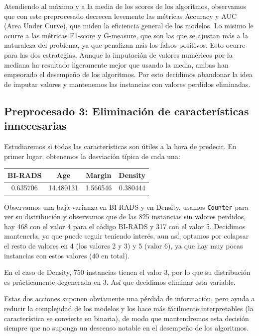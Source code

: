 \documentclass{article}
\begin{document}
Atendiendo al máximo y a la media de los scores de los algoritmos,
observamos que con este preprocesado decrecen levemente las métricas
Accuracy y AUC (Area Under Curve), que miden la eficiencia general de
los modelos. Lo misimo le ocurre a las métricas F1-score y G-measure,
que son las que se ajustan más a la naturaleza del problema, ya que
penalizan más los falsos positivos. Esto ocurre para las dos
estrategias. Aunque la imputación de valores numéricos por la mediana
ha resultado ligeramente mejor que usando la media, ambas han
empeorado el desempeño de los algoritmos. Por esto decidimos abandonar
la idea de imputar valores y mantenemos las instancias con valores
perdidos eliminadas.

\subsection{Preprocesado 3: Eliminación de características innecesarias}

Estudiaremos si todas las características son útiles a la hora de
predecir. En primer lugar, obtenemos la desviación típica de cada una:

\begin{table}[H]
  \centering
  \begin{tabular}{cccc}
    BI-RADS &  Age & Margin & Density \\ \hline
	0.635706 & 14.480131 & 1.566546 & 0.380444
  \end{tabular}
\end{table}
Observamos una baja varianza en BI-RADS y en Density, usamos
\texttt{Counter} para ver su distribución y observamos que de las 825
instancias sin valores perdidos, hay 468 con el valor 4 para el código
BI-RADS y 317 con el valor 5. Decidimos mantenerla, ya que puede
seguir teniendo interés, aun así, optamos por colapsar el resto de
valores en 4 (los valores 2 y 3) y 5 (valor 6), ya que hay muy pocas
instancias con estos valores (40 en total). 

En el caso de Density, 750 instancias tienen el valor 3, por lo que su
distribución es prácticamente degenerada en 3. Así que decidimos
eliminar esta variable.

Estas dos acciones suponen obviamente una pérdida de información, pero
ayuda a reducir la complejidad de los modelos y los hace más
fácilmente interpretables (la característica se convierte en binaria),
de modo que mantendremos esta decisión siempre que no suponga un
descenso notable en el desempeño de los algoritmos.
\end{document}
